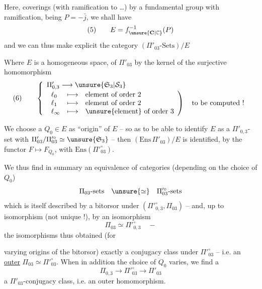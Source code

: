 Here,   coverings  (with ramification  to \dots) by a fundamental group with ramification, being  $P=-\bar j$, we shall have
\[
(5)\qquad E=f_{\unsure{\mathbf C|\mathbb C}}^{-1}(P)
\]
and we can thus make explicit the category $(\Pi'_{03}\text{-Sets})/E$\unsure{;}

Where $E$ is a homogeneous space,   of $\Pi'_{03}$ by the   kernel of the  surjective homomorphism
\[
(6)\qquad
\left\{
\begin{array}{l}
\Pi'_{0,3}\longrightarrow\unsure{\mathfrak S_3|\mathcal S_3}\\[2pt]
\left.
\begin{array}{lll}
\ell_0 &\longmapsto& \text{element of order 2}\\
\ell_1 &\longmapsto& \text{element of order 2}\\
\ell_\infty &\longmapsto& \text{\unsure{element} of order 3}
\end{array}
\right)\quad\text{to be computed !}
\end{array}
\right.
\]

We choose a $Q_0\in E$ as ``origin'' of $E$ -- so as to be able to identify $E$ as a $\Pi'_{0,3}$-set with $\Pi'_{03}/\Pi'^{\circ}_{03}\simeq\unsure{\mathfrak S_3}$ -- then $(\mathrm{Ens}\,\Pi'_{03})/E$ is identified, by the functor $F\longmapsto F_{Q_0}$, with $\mathrm{Ens}(\Pi'^{\circ}_{03})$.

We thus find in summary an equivalence of categories (depending on the choice of $Q_0$)
\[
\Pi_{03}\text{-sets}\quad\unsure{\simeq}\quad\Pi'^{\circ}_{03}\text{-sets}
\]
which is itself described by a bitorsor under $(\Pi'^{\circ}_{0,3},\Pi_{03})$ -- and, up to isomorphism  (not unique !), by an isomorphism
\[
\Pi_{03}\simeq\Pi'^{\circ}_{0,3}\quad -
\]
the isomorphisms thus obtained (for


varying origins of the bitorsor)  exactly a conjugacy class under $\Pi'^{\circ}_{03}$ -- i.e. an \uline{outer} \uline{} $\Pi_{03}\simeq\Pi'^{\circ}_{03}$. When in addition the choice of $Q_0$ varies, we find  a 
\[
\Pi_{0,3}\longrightarrow\Pi'^{\circ}_{03}\longrightarrow\Pi'_{03}
\]
 a $\Pi'_{03}$-conjugacy class, i.e. an outer homomorphism.

